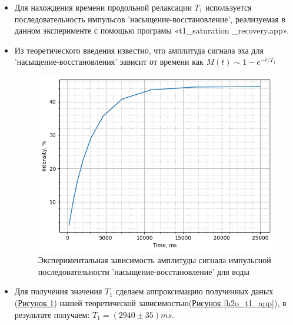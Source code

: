 \documentclass{article}
\begin{document}
\begin{itemize}

\item Для нахождения времени продольной релаксации $T_1$ используется последовательность импульсов 'насыщение-восстановление', реализуемая в данном эксперименте с помощью програмы «t1\_saturation \_recovery.app».
\item Из теоретического введения известно, что амплитуда сигнала эха для 'насыщение-восстановления' зависит от времени как $M(t) \sim 1-e^{-t/T_1}$ 

\begin{figure}[h!] \label{fig4}
    \centering
    \includegraphics[scale = 0.7]{graphs/h20_t1.png}
    \caption{Экспериментальная зависимость амплитуды сигнала импульсной последовательности 'насыщение-восстановление' для воды}
    \label{h2o_t1}
\end{figure} 

\item Для получения значения $T_1$  сделаем аппроксимацию полученных даных (\hyperref[h2o_t1]{Рисунок \ref*{h2o_t1}}) нашей теоретической зависимостью(\hyperref[h2o_t1_app]{Рисунок \ref*{h2o_t1_app}}), в результате получаем: $T_1=(2940\pm 35)ms$.



\end{itemize}
\end{document}
